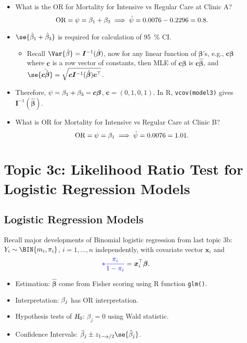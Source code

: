 \documentclass{article}\usepackage[]{graphicx}\usepackage[svgnames]{xcolor}
\let\exp\relax%
\let\log\relax%
\newcommand{\HN}{\textsl{H}_{\textsl{0}}}%
\newcommand{\OR}{\text{OR}}%
\providecommand{\Vector}[1]{\bm{#1}}%
\providecommand{\Matrix}[1]{\bm{#1}}
\begin{document}
\begin{itemize}
      \item What is the OR for Mortality for Intensive vs Regular Care at Clinic A?
            \[ \OR=\psi=\exp{\beta_1+\beta_3}\implies \hat{\psi}=\exp{0.0076-0.2296}=0.8. \]
      \item $ \se{\hat{\beta}_1+\hat{\beta}_3} $ is required for calculation of \qty{95}{\percent} CI.
            \begin{itemize}
                  \item Recall $ \Var{\hat{\beta}}=\Matrix{I}^{-1}(\hat{\Vector{\beta}}) $, now for any linear function of $ \Vector{\beta} $'s,
                        e.g., $ \Vector{c}\Vector{\beta} $ where $ \Vector{c} $ is a row vector of constants, then MLE of $ \Vector{c}\Vector{\beta} $
                        is $ \Vector{c}\hat{\Vector{\beta}} $, and $ \se{\hat{\Vector{c}\hat{\Vector{\beta}}}}=\sqrt{\Vector{c}\Matrix{I}^{-1}(\hat{\Vector{\beta}})\Vector{c}^\top} $.
            \end{itemize}
      \item Therefore, $ \log{\psi}=\beta_1+\beta_3=\Vector{c}\Vector{\beta} $, $ \Vector{c}=(0,1,0,1) $. In R, \texttt{vcov(model3)}
            gives $ \Matrix{I}^{-1}(\hat{\Vector{\beta}}) $.
      \item What is OR for Mortality for Intensive vs Regular Care at Clinic B?
            \[ \OR=\psi=\exp{\beta_1}\implies \hat{\psi}=\exp{0.0076}=1.01. \]
\end{itemize}

\section*{Topic 3c: Likelihood Ratio Test for Logistic Regression Models}
\subsection*{Logistic Regression Models}
Recall major developments of Binomial logistic regression from last topic 3b: $ Y_i \sim \BIN{m_i,\pi_i} $,
$ i=1,\ldots,n $ independently, with covariate vector $ \Vector{x}_i $ and
\[ \textcolor{Blue}{\log*{\frac{\pi_i}{1-\pi_i}}}=\Vector{x}_i^\top \Vector{\beta}. \]
\begin{itemize}
      \item Estimation: $ \hat{\Vector{\beta}} $ come from Fisher scoring using R function \texttt{glm()}.
      \item Interpretation: $ \exp{\beta_j} $ has $ \OR $ interpretation.
      \item Hypothesis tests of $ \HN $: $ \beta_j=0 $ using Wald statistic.
      \item Confidence Intervals: $ \hat{\beta}_j\pm z_{1-\alpha/2}\se{\hat{\beta}_j} $.
\end{itemize}
\end{document}
